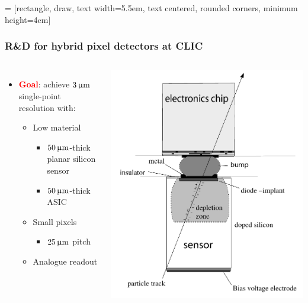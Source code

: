  = [rectangle, draw, text width=5.5em, text centered, rounded corners, minimum
height=4em]
\usetikzlibrary{backgrounds,fit,decorations.pathreplacing} 

\begin{frame}
  \frametitle{R\&D for hybrid pixel detectors at CLIC}

  \begin{columns}[t]
    \begin{itemize}
    \item \textcolor{Red}{\textbf{Goal}}: achieve $3\,\upmu\mathrm{m}$ single-point resolution with:
      \begin{itemize}
      \item Low material
        \begin{itemize}
        \item $50\,\upmu\mathrm{m}$-thick planar silicon sensor
        \item $50\,\upmu\mathrm{m}$-thick ASIC
        \end{itemize} 
      \item Small pixels
        \begin{itemize}
        \item $25\,\upmu\mathrm{m}$ pitch
        \end{itemize}
      \item Analogue readout
      \end{itemize}
    \end{itemize}


    \centering
    \includegraphics[width=\textwidth]{figures/siliconSensorPrinciple.pdf}


\end{columns}
\end{frame}

